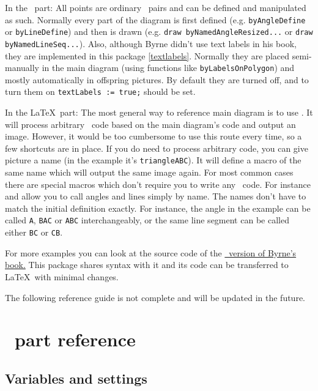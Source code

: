 In the \METAPOST\ part: 
All points are ordinary \METAPOST\ pairs and can be defined and manipulated as such. Normally every part of the diagram is first defined (e.g. \texttt{byAngleDefine} or \texttt{byLineDefine}) and then is drawn (e.g. \texttt{draw byNamedAngleResized...} or \texttt{draw byNamedLineSeq...}). Also, although Byrne didn't use text labels in his book, they are implemented in this package \ref{textlabels}. Normally they are placed semi-manually in the main diagram (using functions like \texttt{byLabelsOnPolygon}) and mostly automatically in offspring pictures. By default they are turned off, and to turn them on \texttt{textLabels := true;} should be set.

In the \LaTeX\ part: 
The most general way to reference main diagram is to use . It will process arbitrary \METAPOST\ code based on the main diagram's code and output an image. However, it would be too cumbersome to use this route every time, so a few shortcuts are in place. If you do need to process arbitrary code, you can give picture a name (in the example it's \texttt{triangleABC}). It will define a macro of the same name  which will output the same image again. For most common cases there are special macros which don't require you to write any \METAPOST\ code. For instance  and  allow you to call angles and lines simply by name. The names don't have to match the initial definition exactly. For instance, the angle in the example can be called \texttt{A}, \texttt{BAC} or \texttt{ABC} interchangeably, or the same line segment can be called either \texttt{BC} or \texttt{CB}.

For more examples you can look at the source code of the \href{https://github.com/jemmybutton/byrne-euclid/}{\ConTeXt\ version of Byrne's book.} This package shares syntax with it and its code can be transferred to \LaTeX\ with minimal changes.

The following reference guide is not complete and will be updated in the future.

\section{\METAPOST\ part reference}

\subsection{Variables and settings}

